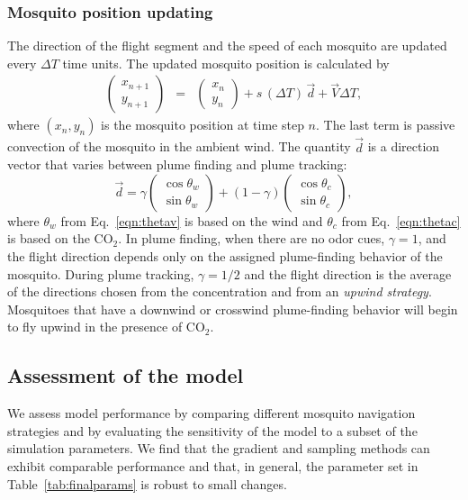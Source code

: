 \documentclass[10pt]{article}
\begin{document}
\subsubsection*{Mosquito position updating}
The direction of the flight segment and the speed of each mosquito are updated every $\Delta T$ time units. 
The updated mosquito position is calculated by
\begin{eqnarray*}
	\begin{pmatrix} x_{n+1} \\ y_{n+1} \end{pmatrix} &=&
	\begin{pmatrix} x_n \\ y_n \end{pmatrix} + s\,(\Delta T) \,\vec{d} + \vec{V}\Delta T , 
\end{eqnarray*}
where $(x_n,y_n)$ is the mosquito position at time step $n$. The last term is passive convection of the mosquito in the ambient wind. The quantity $\vec{d}$ is a direction vector that varies between plume finding and plume tracking: 
\begin{equation*}
	\vec{d} = \gamma\begin{pmatrix}  \cos{\theta_w}\\ \sin{\theta_w} \end{pmatrix} + (1-\gamma)\begin{pmatrix}  \cos{\theta_c}\\ \sin{\theta_c} \end{pmatrix},
\end{equation*}
where $\theta_w$ from Eq.~\eqref{eqn:thetav} is based on the wind and $\theta_c$ from Eq.~\eqref{eqn:thetac} is based on the $\mbox{CO}_2$. In plume finding, when there are no odor cues, $\gamma = 1$, and the flight direction depends only on the assigned plume-finding behavior of the mosquito. 
During plume tracking, $\gamma = 1/2$
and the flight direction is the average of the directions chosen from the concentration and from an \textit{upwind strategy}. Mosquitoes that have a downwind or crosswind plume-finding behavior will begin to fly upwind in the presence of $\mbox{CO}_2$. 


\subsection*{Assessment of the model}
We assess model performance by comparing 
different mosquito navigation strategies and by evaluating the sensitivity of the model to a subset of the 
simulation parameters.  We find that the gradient and sampling methods can exhibit comparable performance and that, in general, the parameter set in Table~\ref{tab:finalparams} is robust to small changes.
\end{document}
